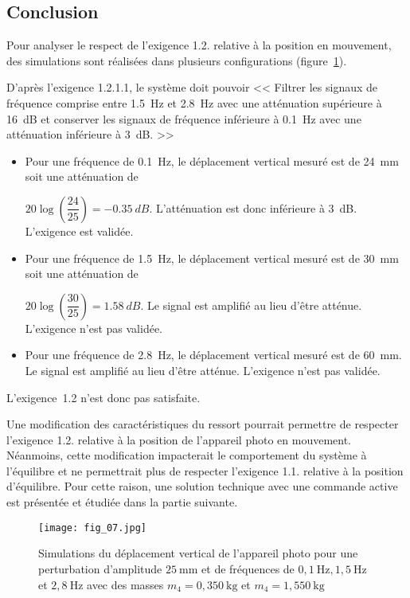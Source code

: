 \subsection{Conclusion}
\ifprof
\else
Pour analyser le respect de l'exigence 1.2. relative à la position en mouvement, des simulations sont réalisées dans plusieurs configurations (figure~\ref{fig:07}).
\fi

\ifprof
\begin{corrige}
D'après l’exigence 1.2.1.1, le système doit pouvoir << Filtrer les signaux de fréquence comprise entre \SI{1,5}{Hz} et \SI{2,8}{Hz} avec une atténuation supérieure à \SI{16}{dB} et conserver les signaux
de fréquence inférieure à \SI{0,1}{Hz} avec une atténuation inférieure à \SI{3}{dB}. >>

\begin{itemize}
\item Pour une fréquence de \SI{0,1}{Hz}, le déplacement vertical mesuré est de \SI{24}{mm} soit une atténuation de 

$20\log \left( \dfrac{24}{25}\right) = -\SI{0,35}{dB}$. L'atténuation est donc inférieure à \SI{3}{dB}. L'exigence est validée.

\item Pour une fréquence de \SI{1,5}{Hz}, le déplacement vertical mesuré est de \SI{30}{mm} soit une atténuation de 

$20\log \left( \dfrac{30}{25}\right) = \SI{1,58}{dB}$. Le signal est amplifié au lieu d'être atténue. L'exigence n'est pas validée.

\item Pour une fréquence de \SI{2,8}{Hz}, le déplacement vertical mesuré est de \SI{60}{mm}. Le signal est amplifié au lieu d'être atténue. L'exigence n'est pas validée.

\end{itemize}

L'exigence~1.2 n'est donc pas satisfaite. 

\end{corrige}
\else
\fi

\ifprof
\else
Une modification des caractéristiques du ressort pourrait permettre de respecter l'exigence 1.2. relative à la position de l'appareil photo en mouvement. Néanmoins, cette modification impacterait le comportement du système à l'équilibre et ne permettrait plus de respecter l'exigence 1.1. relative à la position d'équilibre. Pour cette raison, une solution technique avec une commande active est présentée et étudiée dans la partie suivante.


\begin{figure}[H]
\centering
\texttt{[image: fig\_07.jpg]}
\caption{\label{fig:07} Simulations du déplacement vertical de l'appareil photo pour une perturbation d'amplitude $25 \mathrm{~mm}$ et de fréquences de $0,1 \mathrm{~Hz}, 1,5 \mathrm{~Hz}$ et $2,8 \mathrm{~Hz}$ avec des masses $m_{4}=0,350 \mathrm{~kg}$ et $m_{4}=1,550 \mathrm{~kg}$
}
\end{figure}
\fi

